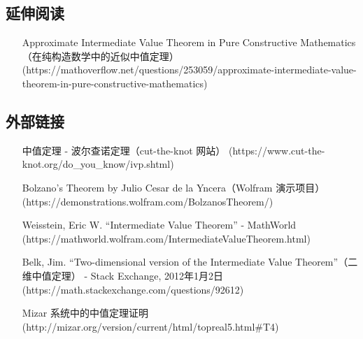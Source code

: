 \subsection{延伸阅读}
\begin{itemize}
\item [Approximate Intermediate Value Theorem in Pure Constructive Mathematics（在纯构造数学中的近似中值定理）](https://mathoverflow.net/questions/253059/approximate-intermediate-value-theorem-in-pure-constructive-mathematics)
\end{itemize}
\subsection{外部链接}
\begin{itemize}
\item [中值定理 - 波尔查诺定理（cut-the-knot 网站）](https://www.cut-the-knot.org/do_you_know/ivp.shtml)
\item [Bolzano's Theorem by Julio Cesar de la Yncera（Wolfram 演示项目）](https://demonstrations.wolfram.com/BolzanosTheorem/)
\item [Weisstein, Eric W. “Intermediate Value Theorem” - MathWorld](https://mathworld.wolfram.com/IntermediateValueTheorem.html)
\item [Belk, Jim. “Two-dimensional version of the Intermediate Value Theorem”（二维中值定理） - Stack Exchange, 2012年1月2日](https://math.stackexchange.com/questions/92612)
\item [Mizar 系统中的中值定理证明](http://mizar.org/version/current/html/topreal5.html#T4)
\end{itemize}